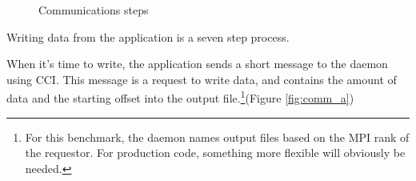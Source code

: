 \begin{figure}[!t]
{{    \label{fig:comm_d}}}    
\centerline{
  \hfil
  } 
\centerline{
  } 
\caption{Communications steps}
\label{fig:communications}
\end{figure}


Writing data from the application is a seven step process.

When it's time to write, the application sends a short message to the daemon using CCI.  This message is a request to write data, and contains the amount of data and the starting offset into the output file.\footnote{For this benchmark, the daemon names output files based on the MPI rank of the requestor.  For production code, something more flexible will obviously be needed.}(Figure \ref{fig:comm_a})

